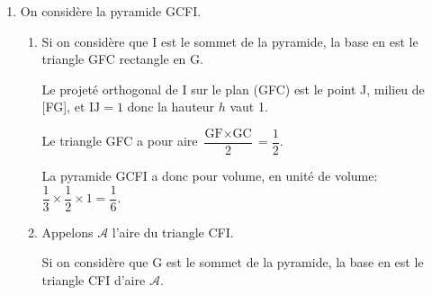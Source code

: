 \begin{enumerate}
\begin{enumerate}
$\left \{
\begin{array}{r !{=} r !{=} l !{=} l}
x & 1+t & 1 -\frac{2}{9} & \frac{7}{9}\\[4pt]
y & 1+2t & 1- 2\times \frac{2}{9} & \frac{5}{9}\\[4pt]
z &1+ 2t & 1- 2\times \frac{2}{9} & \frac{5}{9}
\end{array}
\right .$

Donc le projeté orthogonal K du point G sur le plan (CFI) a pour coordonnées $\left (\dfrac{7}{9}\;; \dfrac{5}{9}\;; \dfrac{5}{9} \right )$.
		\item La distance du point G au plan (CFI) est:
		
$\text{GK}= \ds\sqrt{(x_{\text K} - x_{\text G})^2 + (y_{\text K} - y_{\text G})^2 +(z_{\text K} - z_{\text G})^2 }
= \ds\sqrt{\left ( \frac{7}{9} - 1\right )^2 + \left ( \frac{5}{9} - 1\right )^2+\left ( \frac{5}{9} - 1\right )^2}\\
\phantom{\text{GK}}
= \ds\sqrt{\left ( -\frac{2}{9}\right )^2 + \left ( -\frac{4}{9}\right )^2+\left ( -\frac{4}{9}\right )^2}
=\ds\sqrt{\frac{4}{81} + \frac{16}{81} + \frac{16}{81}}
=\ds\sqrt{ \frac{36}{81}}
= \frac{6}{9}
= \frac23$.
	\end{enumerate}
	
\item On considère la pyramide GCFI.

%
%

	\begin{enumerate}
		\item %
Si on considère que I est le sommet de la pyramide, la base en est le triangle GFC rectangle en G.

Le projeté orthogonal de I sur le plan (GFC) est le point J, milieu de [FG], et $\text{IJ}=1$ donc la hauteur $h$ vaut 1.

Le triangle GFC a pour aire $\dfrac{\text{GF}\times \text{GC}}{2} = \dfrac{1}{2}$.

La pyramide GCFI a donc pour volume, en unité de volume:  $\dfrac{1}{3}\times \dfrac{1}{2}\times 1 = \dfrac{1}{6}$.
		
		\item Appelons $\mathcal{A}$ l'aire du triangle CFI.
		
Si on considère que G est le sommet de la pyramide, la base en est le triangle CFI d'aire $\mathcal{A}$.


\end{enumerate}
\end{enumerate}
